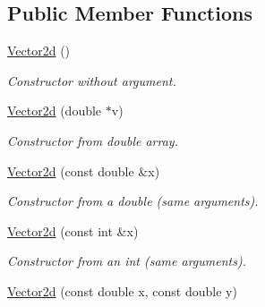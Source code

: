 \subsection*{Public Member Functions}
\begin{DoxyCompactItemize}
\item 
\mbox{\label{classtopology_1_1Vector2d_a8adf275719f6f76f566040dba99102be}} 
\mbox{\hyperlink{classtopology_1_1Vector2d_a8adf275719f6f76f566040dba99102be}{Vector2d}} ()
\begin{DoxyCompactList}\small\item\em Constructor without argument. \end{DoxyCompactList}\item 
\mbox{\label{classtopology_1_1Vector2d_a6886f1eb4cd3190ea3b5848885677883}} 
\mbox{\hyperlink{classtopology_1_1Vector2d_a6886f1eb4cd3190ea3b5848885677883}{Vector2d}} (double $\ast$v)
\begin{DoxyCompactList}\small\item\em Constructor from double array. \end{DoxyCompactList}\item 
\mbox{\label{classtopology_1_1Vector2d_ac0ff78408ea0a2156586a7d4d2850a52}} 
\mbox{\hyperlink{classtopology_1_1Vector2d_ac0ff78408ea0a2156586a7d4d2850a52}{Vector2d}} (const double \&x)
\begin{DoxyCompactList}\small\item\em Constructor from a double (same arguments). \end{DoxyCompactList}\item 
\mbox{\label{classtopology_1_1Vector2d_a5a82724dca240e6606be99c3e7f8f114}} 
\mbox{\hyperlink{classtopology_1_1Vector2d_a5a82724dca240e6606be99c3e7f8f114}{Vector2d}} (const int \&x)
\begin{DoxyCompactList}\small\item\em Constructor from an int (same arguments). \end{DoxyCompactList}\item 
\mbox{\label{classtopology_1_1Vector2d_a1542f7c25d58a1f0f756703dc44d49ce}} 
\mbox{\hyperlink{classtopology_1_1Vector2d_a1542f7c25d58a1f0f756703dc44d49ce}{Vector2d}} (const double x, const double y)

\end{DoxyCompactItemize}
